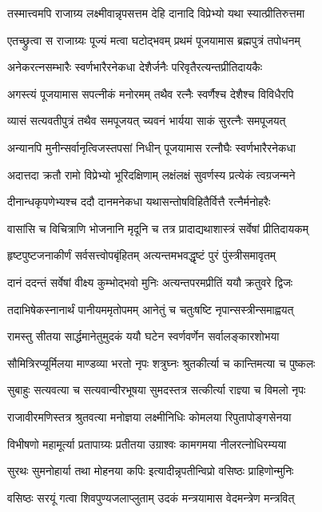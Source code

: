 \twolineshloka
{तस्मात्त्वमपि राजाग्र्य लक्ष्मीवान्नृपसत्तम}
{देहि दानादि विप्रेभ्यो यथा स्यात्प्रीतिरुत्तमा}%

\twolineshloka
{एतच्छ्रुत्वा स राजाग्र्यः पूज्यं मत्वा घटोद्भवम्}
{प्रथमं पूजयामास ब्रह्मपुत्रं तपोधनम्}%

\twolineshloka
{अनेकरत्नसम्भारैः स्वर्णभारैरनेकधा}
{देशैर्जनैः परिवृतैरत्यन्तप्रीतिदायकैः}%

\twolineshloka
{अगस्त्यं पूजयामास सपत्नीकं मनोरमम्}
{तथैव रत्नैः स्वर्णैश्च देशैश्च विविधैरपि}%

\twolineshloka
{व्यासं सत्यवतीपुत्रं तथैव समपूजयत्}
{च्यवनं भार्यया साकं सुरत्नैः समपूजयत्}%

\twolineshloka
{अन्यानपि मुनीन्सर्वानृत्विजस्तपसां निधीन्}
{पूजयामास रत्नौघैः स्वर्णभारैरनेकधा}%

\twolineshloka
{अदात्तदा क्रतौ रामो विप्रेभ्यो भूरिदक्षिणाम्}
{लक्षंलक्षं सुवर्णस्य प्रत्येकं त्वग्रजन्मने}%

\twolineshloka
{दीनान्धकृपणेभ्यश्च ददौ दानमनेकधा}
{यथासन्तोषविहितैर्वित्तै रत्नैर्मनोहरैः}%

\twolineshloka
{वासांसि च विचित्राणि भोजनानि मृदूनि च}
{तत्र प्रादाद्यथाशास्त्रं सर्वेषां प्रीतिदायकम्}%

\twolineshloka
{हृष्टपुष्टजनाकीर्णं सर्वसत्त्वोपबृंहितम्}
{अत्यन्तमभवद्धृष्टं पुरं पुंस्त्रीसमावृतम्}%

\twolineshloka
{दानं ददन्तं सर्वेषां वीक्ष्य कुम्भोद्भवो मुनिः}
{अत्यन्तपरमप्रीतिं ययौ क्रतुवरे द्विजः}%

\twolineshloka
{तदाभिषेकस्नानार्थं पानीयममृतोपमम्}
{आनेतुं च चतुःषष्टि नृपान्सस्त्रीन्समाह्वयत्}%

\twolineshloka
{रामस्तु सीतया सार्द्धमानेतुमुदकं ययौ}
{घटेन स्वर्णवर्णेन सर्वालङ्कारशोभया}%

\twolineshloka
{सौमित्रिरप्यूर्मिलया माण्डव्या भरतो नृपः}
{शत्रुघ्नः श्रुतकीर्त्या च कान्तिमत्या च पुष्कलः}%

\twolineshloka
{सुबाहुः सत्यवत्या च सत्यवान्वीरभूषया}
{सुमदस्तत्र सत्कीर्त्या राज्ञ्या च विमलो नृपः}%

\twolineshloka
{राजावीरमणिस्तत्र श्रुतवत्या मनोज्ञया}
{लक्ष्मीनिधिः कोमलया रिपुतापोङ्गसेनया}%

\twolineshloka
{विभीषणो महामूर्त्या प्रतापाग्र्यः प्रतीतया}
{उग्राश्वः कामगमया नीलरत्नोधिरम्यया}%

\twolineshloka
{सुरथः सुमनोहार्या तथा मोहनया कपिः}
{इत्यादीन्नृपतीन्विप्रो वसिष्ठः प्राहिणोन्मुनिः}%

\twolineshloka
{वसिष्ठः सरयूं गत्वा शिवपुण्यजलाप्लुताम्}
{उदकं मन्त्रयामास वेदमन्त्रेण मन्त्रवित्}%

